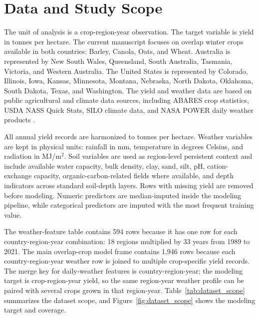 \documentclass[11pt,a4paper]{article}
\begin{document}
\section{Data and Study Scope}
The unit of analysis is a crop-region-year observation. The target variable is yield in tonnes per hectare. The current manuscript focuses on overlap winter crops available in both countries: Barley, Canola, Oats, and Wheat. Australia is represented by New South Wales, Queensland, South Australia, Tasmania, Victoria, and Western Australia. The United States is represented by Colorado, Illinois, Iowa, Kansas, Minnesota, Montana, Nebraska, North Dakota, Oklahoma, South Dakota, Texas, and Washington. The yield and weather data are based on public agricultural and climate data sources, including ABARES crop statistics, USDA NASS Quick Stats, SILO climate data, and NASA POWER daily weather products \citep{ABARES2026CropReport,USDANASSQuickStats,USDANASSDeveloper,SILOClimate,NASAPOWERDaily,NASAPOWERParameters}.

All annual yield records are harmonized to tonnes per hectare. Weather variables are kept in physical units: rainfall in mm, temperature in degrees Celsius, and radiation in MJ/m$^2$. Soil variables are used as region-level persistent context and include available water capacity, bulk density, clay, sand, silt, pH, cation-exchange capacity, organic-carbon-related fields where available, and depth indicators across standard soil-depth layers. Rows with missing yield are removed before modeling. Numeric predictors are median-imputed inside the modeling pipeline, while categorical predictors are imputed with the most frequent training value.

The weather-feature table contains 594 rows because it has one row for each country-region-year combination: 18 regions multiplied by 33 years from 1989 to 2021. The main overlap-crop model frame contains 1,946 rows because each country-region-year weather row is joined to multiple crop-specific yield records. The merge key for daily-weather features is country-region-year; the modeling target is crop-region-year yield, so the same region-year weather profile can be paired with several crops grown in that region-year. Table~\ref{tab:dataset_scope} summarizes the dataset scope, and Figure~\ref{fig:dataset_scope} shows the modeling target and coverage.

\begin{table}[!htbp]
\centering
\caption{Dataset scope used in the daily extreme-weather decision-support study.}
\label{tab:dataset_scope}
\scriptsize
\resizebox{\textwidth}{!}{}
\end{table}
\end{document}
